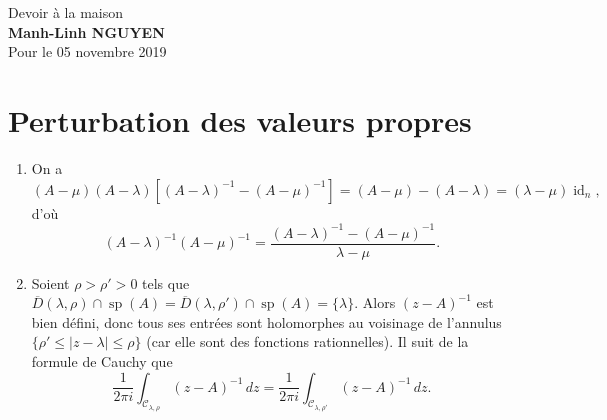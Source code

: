 \documentclass[french]{article}
\theoremstyle{definition}
\newcommand{\ol}[1]{\overline{#1}}
\newcommand{\Ccal}{\mathcal{C}}
\newcommand{\id}{\operatorname{id}}
\newcommand{\spec}{\operatorname{sp}}
\begin{document}
	
	
\begin{center}
	{\Large Devoir \`a la maison}\\
	\textbf{Manh-Linh NGUYEN}\\ Pour le  05 novembre 2019
\end{center}
	
\vspace{0.2 cm}

\section*{Perturbation des valeurs propres}

\begin{enumerate}
    \item \label{Partie1} On a
        $$(A - \mu)(A - \lambda)[(A - \lambda)^{-1} - (A - \mu)^{-1}] = (A - \mu) - (A - \lambda) = (\lambda - \mu)\id_n,$$
    d'o\`u 
        \begin{equation} \label{eq1}
            (A - \lambda)^{-1}(A - \mu)^{-1} = \frac{(A - \lambda)^{-1} - (A - \mu)^{-1}}{\lambda - \mu}.
        \end{equation}
        
    \item \label{Partie2} Soient $\rho > \rho' > 0$ tels que $\ol{D}(\lambda,\rho) \cap \spec(A) = \ol{D}(\lambda,\rho') \cap \spec(A) = \{\lambda\}$. Alors $(z-A)^{-1}$ est bien d\'efini, donc tous ses entr\'ees sont holomorphes au voisinage de l'annulus $\{\rho' \le |z - \lambda| \le \rho\}$ (car elle sont des fonctions rationnelles). Il suit de la formule de Cauchy que
        \begin{equation*}
            \frac{1}{2\pi i} \int_{\Ccal_{\lambda,\rho}} (z - A)^{-1}\,dz = \frac{1}{2\pi i} \int_{\Ccal_{\lambda,\rho'}} (z - A)^{-1}\,dz.
        \end{equation*}
    

\end{enumerate}
\end{document}
